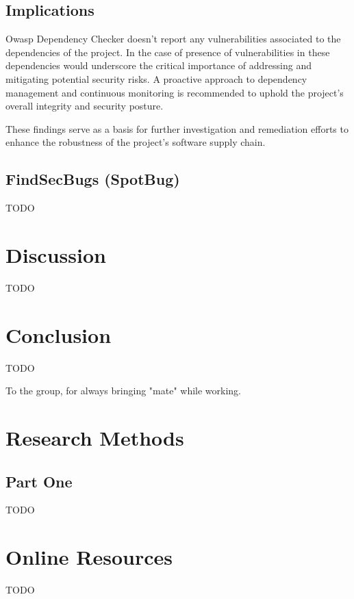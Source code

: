 \documentclass[sigconf]{acmart}
\begin{document}
\subsection{Implications}

Owasp Dependency Checker doesn't report any vulnerabilities associated to the dependencies of the project. In the case of presence of vulnerabilities in these dependencies would underscore the critical importance of addressing and mitigating potential security risks. A proactive approach to dependency management and continuous monitoring is recommended to uphold the project's overall integrity and security posture.

These findings serve as a basis for further investigation and remediation efforts to enhance the robustness of the project's software supply chain.


\subsection{FindSecBugs (SpotBug)}
TODO

\section{Discussion}
TODO

\section{Conclusion}
TODO

\begin{acks}
To the group, for always bringing "mate" while working.
\end{acks}





\appendix

\section{Research Methods}

\subsection{Part One}
TODO

\section{Online Resources}
TODO
\end{document}
